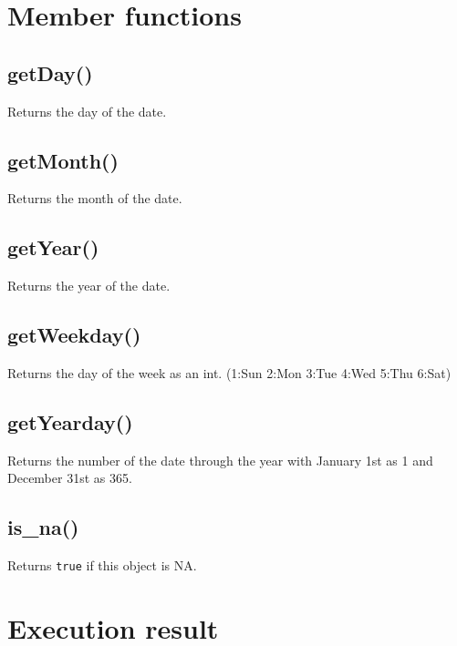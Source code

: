 \documentclass[]{book}
\begin{document}
\hypertarget{member-functions-5}{%
\section{Member functions}\label{member-functions-5}}

\hypertarget{getday}{%
\subsection{getDay()}\label{getday}}

Returns the day of the date.

\hypertarget{getmonth}{%
\subsection{getMonth()}\label{getmonth}}

Returns the month of the date.

\hypertarget{getyear}{%
\subsection{getYear()}\label{getyear}}

Returns the year of the date.

\hypertarget{getweekday}{%
\subsection{getWeekday()}\label{getweekday}}

Returns the day of the week as an int. (1:Sun 2:Mon 3:Tue 4:Wed 5:Thu 6:Sat)

\hypertarget{getyearday}{%
\subsection{getYearday()}\label{getyearday}}

Returns the number of the date through the year with January 1st as 1 and December 31st as 365.

\hypertarget{is_na}{%
\subsection{is\_na()}\label{is_na}}

Returns \texttt{true} if this object is NA.

\hypertarget{execution-result}{%
\section{Execution result}\label{execution-result}}
\end{document}
